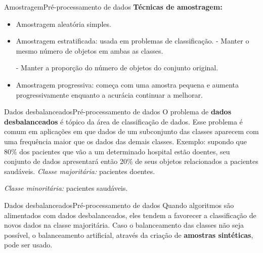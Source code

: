 \documentclass[t]{beamer}
\begin{document}

\begin{ftst}{Amostragem}{Pré-processamento de dados}
\justifying
\textbf{Técnicas de amostragem:}
\vone
\begin{itemize}
    \item Amostragem aleatória simples.
    \vone
    \item Amostragem estratificada: usada em problemas de classificação.
    - Manter o mesmo número de objetos em ambas as classes.
    
    - Manter a proporção do número de objetos do conjunto original.
    \vone
    \item Amostragem progressiva: começa com uma amostra pequena e aumenta progressivamente enquanto a acurácia continuar a melhorar.
\end{itemize}

\end{ftst}


\begin{ftst}{Dados desbalanceados}{Pré-processamento de dados}
\justifying
O problema de \textbf{dados desbalanceados} é tópico da área de classificação de dados.
\vone
Esse problema é comum em aplicações em que dados de um subconjunto das classes aparecem com uma frequência maior que os dados das demais classes.
\vone
Exemplo: supondo que 80\% dos pacientes que vão a um determinado hospital estão doentes, seu conjunto de dados apresentará então 20\% de seus objetos relacionados a pacientes saudáveis.
\vone
\textit{Classe majoritária:} pacientes doentes.

\textit{Classe minoritária:} pacientes saudáveis.

\end{ftst}


\begin{ftst}{Dados desbalanceados}{Pré-processamento de dados}
\justifying
Quando algoritmos são alimentados com dados desbalanceados, eles tendem a favorecer a classificação de novos dados na classe majoritária.
\vone
Caso o balanceamento das classes não seja possível, o balanceamento artificial, através da criação de \textbf{amostras sintéticas}, pode ser usado.
\vone

\end{ftst}

\end{document}
